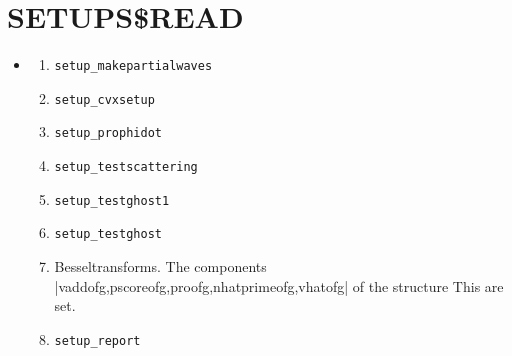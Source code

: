 \documentclass[11pt,a4paper]{report}
\begin{document}
\section{SETUPS\$READ}

\begin{itemize}
%
\item
\begin{enumerate}
\item \verb|setup_makepartialwaves|
%
\item \verb|setup_cvxsetup|
%
\item \verb|setup_prophidot|
%
\item \verb|setup_testscattering|
%
\item \verb|setup_testghost1|
%
\item \verb|setup_testghost|

%
\item Besseltransforms. The components
  |vaddofg,pscoreofg,proofg,nhatprimeofg,vhatofg| of the structure This are set.

\item \verb|setup_report|

\end{enumerate}
%
\end{itemize}

\end{document}
